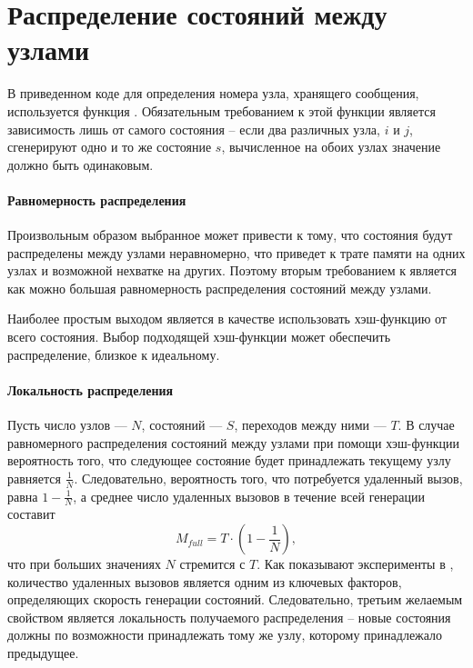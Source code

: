 \section{Распределение состояний между узлами}
\label{sec:state-partition}

В приведенном коде для определения номера узла, хранящего сообщения, используется функция
. Обязательным требованием к этой функции является зависимость лишь от
самого состояния -- если два различных узла, $i$ и $j$, сгенерируют одно и то же состояние
$s$, вычисленное на обоих узлах значение  должно быть одинаковым.

\paragraph{Равномерность распределения}
\label{sec:partition-homogenity}

Произвольным образом выбранное  может привести к тому, что состояния будут
распределены между узлами неравномерно, что приведет к трате памяти на одних узлах и
возможной нехватке на других. Поэтому вторым требованием к  является как
можно большая равномерность распределения состояний между узлами. 

Наиболее простым выходом является в качестве  использовать хэш-функцию от
всего состояния. Выбор подходящей хэш-функции может обеспечить распределение, близкое к
идеальному.

\paragraph{Локальность распределения}
\label{sec:partition-locality}

Пусть число узлов — $N$, состояний — $S$, переходов между ними — $T$. В случае
равномерного распределения состояний между узлами при помощи хэш-функции вероятность того,
что следующее состояние будет принадлежать текущему узлу равняется
$\frac{1}{N}$. Следовательно, вероятность того, что потребуется удаленный вызов, равна $1
- \frac{1}{N}$, а среднее число удаленных вызовов в течение всей генерации составит
\begin{equation}
  \label{eq:nmsg-full-hash}
  M_{full} = T \cdot (1 - \frac{1}{N}) ,
\end{equation}
что при больших значениях $N$ стремится с $T$. Как показывают эксперименты в \cite{LT99},
количество удаленных вызовов является одним из ключевых факторов, определяющих скорость
генерации состояний. Следовательно, третьим желаемым свойством  является
локальность получаемого распределения -- новые состояния должны по возможности
принадлежать тому же узлу, которому принадлежало предыдущее.

